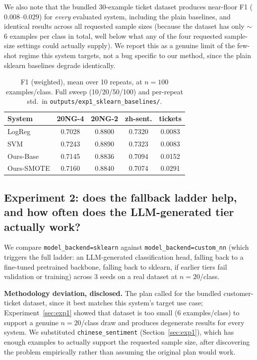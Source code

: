 \documentclass[10pt,twocolumn]{article}
\begin{document}
We also note that the bundled 30-example ticket dataset produces
near-floor F1 ($0.008$--$0.029$) for \emph{every} evaluated system,
including the plain baselines, and identical results across all requested
sample sizes (because the dataset has only $\sim$6 examples per class in
total, well below what any of the four requested sample-size settings
could actually supply). We report this as a genuine limit of the few-shot
regime this system targets, not a bug specific to our method, since the
plain sklearn baselines degrade identically.

\begin{table}[t]
\centering
\caption{F1 (weighted), mean over 10 repeats, at $n{=}100$ examples/class.
Full sweep (10/20/50/100) and per-repeat std.\ in \texttt{outputs/exp1\_sklearn\_baselines/}.}
\label{tab:exp1}
\small
\begin{tabular}{lcccc}
\toprule
System & 20NG-4 & 20NG-2 & zh-sent. & tickets \\
\midrule
LogReg        & 0.7028 & 0.8800 & 0.7320 & 0.0083 \\
SVM           & 0.7243 & 0.8890 & 0.7323 & 0.0083 \\
Ours-Base     & 0.7145 & 0.8836 & 0.7094 & 0.0152 \\
Ours-SMOTE    & 0.7160 & 0.8840 & 0.7074 & 0.0291 \\
\bottomrule
\end{tabular}
\end{table}

\subsection{Experiment 2: does the fallback ladder help, and how often does the LLM-generated tier actually work?}
\label{sec:exp2}

We compare \texttt{model\_backend=sklearn} against
\texttt{model\_backend=custom\_nn} (which triggers the full ladder: an
LLM-generated classification head, falling back to a fine-tuned pretrained
backbone, falling back to sklearn, if earlier tiers fail validation or
training) across 3 seeds on a real dataset at $n{=}20$/class.

\textbf{Methodology deviation, disclosed.} The plan called for the
bundled customer-ticket dataset, since it best matches this system's target
use case; Experiment~\ref{sec:exp1} showed that dataset is too small
(6 examples/class) to support a genuine $n{=}20$/class draw and produces
degenerate results for every system. We substituted
\texttt{chinese\_sentiment} (Section~\ref{sec:exp1}), which has enough
examples to actually support the requested sample size, after discovering
the problem empirically rather than assuming the original plan would work.
\end{document}
